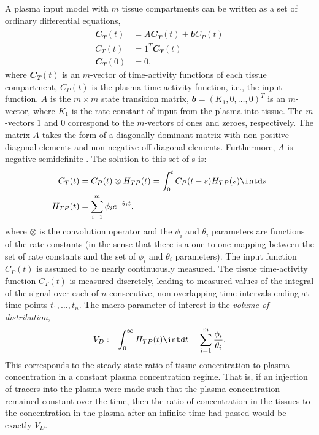 A plasma input model with $m$ tissue compartments can be written as a set of
ordinary differential equations,
\begin{align*}
  \dot{\mathbfit{C}}_{\mathbfit{T}}(t) & = A \mathbfit{C}_{\mathbfit{T}}(t) + \mathbfit{b} C_P(t)\\
  C_T(t) & = \mathbfit{1}^T\mathbfit{C}_{\mathbfit{T}}(t) \\
  \mathbfit{C}_{\mathbfit{T}}(0) & = \mathbfit{0},
\end{align*}
where $\mathbfit{C}_{\mathbfit{T}}(t)$ is an $m$-vector of time-activity functions of
each tissue compartment, $C_P(t)$ is the plasma time-activity function,
i.e., the input function. $A$ is the $m \times m$ state transition
matrix, $\mathbfit{b} = (K_1, 0, \dots, 0)^T$ is an $m$-vector, where $K_1$ is
the rate constant of input from the plasma into tissue. The $m$-vectors
$\mathbfit{1}$ and $\mathbfit{0}$ correspond to the $m$-vectors of ones and zeroes,
respectively. The matrix $A$ takes the form of a diagonally dominant
matrix with non-positive diagonal elements and non-negative off-diagonal
elements. Furthermore, $A$ is negative semidefinite \cite{Gunn:2001cx}.
The solution to this set of \ode{}s is:
\begin{align}
  C_T(t) & = C_P(t) \otimes H_{TP}(t) = \int_0^t C_P(t-s) H_{TP}(s)\intd s
  \label{eq:CT} \\
  H_{TP}(t) & = \sum_{i=1}^m \phi_i e^{-\theta_i t},\notag
\end{align}
where $\otimes$ is the convolution operator and the $\phi_i$ and $\theta_i$
parameters are functions of the rate constants (in the sense that there is a
one-to-one mapping between the set of rate constants and the set of
$\phi_i$ and $\theta_i$ parameters). The input function $C_P(t)$
is assumed to be nearly continuously measured. The tissue time-activity
function $C_T(t)$ is measured discretely, leading to measured values of the
integral of the signal over each of $n$ consecutive, non-overlapping time
intervals ending at time points $t_1, \dots, t_n$.  The macro parameter of
interest is the \emph{volume of distribution},
\begin{equation*}
  V_D := \int_0^{\infty} H_{TP}(t) \intd t = \sum_{i=1}^m
  \frac{\phi_i}{\theta_i}.
\end{equation*}
This corresponds to the steady state ratio of tissue concentration to
plasma concentration in a constant plasma concentration regime. That is, if
an injection of tracers into the plasma were made such that the plasma
concentration remained constant over the time, then the ratio of
concentration in the tissues to the concentration in the plasma after an
infinite time had passed would be exactly $V_D$.

